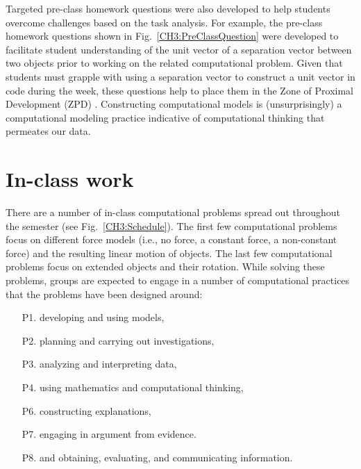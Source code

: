 \documentclass{msuphddissertation}
\begin{document}
\begin{doublespace}
Targeted pre-class homework questions were also developed to help students overcome challenges based on the task analysis.  For example, the pre-class homework questions shown in Fig.~\ref{CH3:PreClassQuestion} were developed to facilitate student understanding of the unit vector of a separation vector between two objects prior to working on the related computational problem.  Given that students must grapple with using a separation vector to construct a unit vector in code during the week, these questions help to place them in the Zone of Proximal Development (ZPD) \cite{Vygotsky1980}.  Constructing computational models is (unsurprisingly) a computational modeling practice indicative of computational thinking that permeates our data.

\section{In-class work}

There are a number of in-class computational problems spread out throughout the semester (see Fig.~\ref{CH3:Schedule}).  The first few computational problems focus on different force models (i.e., no force, a constant force, a non-constant force) and the resulting linear motion of objects.  The last few computational problems focus on extended objects and their rotation.  While solving these problems, groups are expected to engage in a number of computational practices that the problems have been designed around: \begin{enumerate}
\item[P1.] developing and using models,
\item[P2.] planning and carrying out investigations,
\item[P3.] analyzing and interpreting data,
\item[P4.] using mathematics and computational thinking,
\item[P6.] constructing explanations,
\item[P7.] engaging in argument from evidence.
\item[P8.] and obtaining, evaluating, and communicating information.
\end{enumerate}


\end{doublespace}
\end{document}
